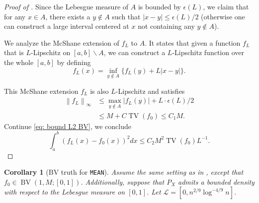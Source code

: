 \documentclass[12pt]{article}
\newtheorem{corollary}[theorem]{Corollary}
\begin{document}
\begin{appendices}
\begin{proof}[Proof of ]
Since the Lebesgue measure of $A$ is bounded by $\epsilon(L)$, we claim that for any $x\in A$, there exists a $y \notin A$ such that $|x-y|\leq \epsilon(L)/2$ (otherwise one can construct a large interval centered at $x$ not containing any $y\notin A$). 

We analyze the McShane extension \citep[Section 3.1, Theorem 1]{evans2018measure} of $f_L$ to $A$. It states that given a function $f_L$ that is $L$-Lipschitz on $[a,b]\backslash A$, we can construct a $L$-Lipschitz function over the whole $[a,b]$ by defining
$$
f_L(x) = \inf _{y \notin A}\{f_L(y)+L|x-y|\}.
$$

This McShane extension $f_L$ is also $L$-Lipschitz and satisfies
\begin{equation*}
\begin{aligned}
\left\|f_L\right\|_{\infty} &\leq \max _{y \notin A}\left|f_L(y)\right|+L \cdot \epsilon(L) / 2 \\
& \leq M+C \operatorname{TV}(f_0) \leq C_1 M.
\end{aligned}
\end{equation*}
Continue \eqref{eq: bound L2 BV}, we conclude 
$$
\int_a^b\left(f_L(x)-f_0(x)\right)^2 d x \leq C_2 M^2 \operatorname{TV}(f_0) L^{-1}.
$$
\end{proof}

\begin{corollary}[BV truth for \texttt{MEAN}]\label{cor: BV case} 
Assume the same setting as in , except that $f_0 \in \operatorname{BV}(1, M; [0,1])$. Additionally, suppose that $P_X$ admits a bounded density with respect to the Lebesgue measure on $[0,1]$. Let $\mathcal{L} = [0,n^{2/9} \log^{-4/9} n]$.


\end{corollary}
\end{appendices}
\end{document}
